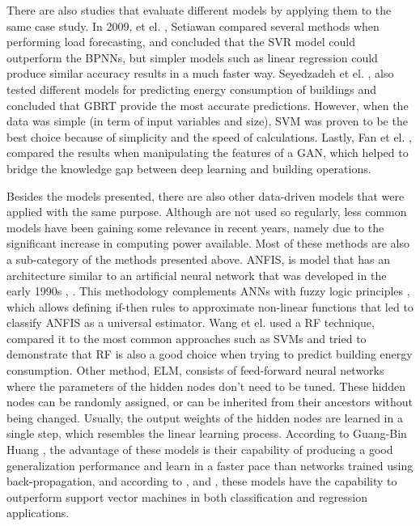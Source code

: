 There are also studies that evaluate different models by applying them to the same case study. In 2009, et el. \cite{svmr0}, Setiawan compared several methods when performing load forecasting, and concluded that the \ac{SVR} model could outperform the \ac{BPNN}s, but simpler models such as linear regression could produce similar accuracy results in a much faster way. Seyedzadeh et el. \cite{other2}, also tested different models for predicting energy consumption of buildings and concluded that \ac{GBRT} provide the most accurate predictions. However, when the data was simple (in term of input variables and size), \ac{SVM} was proven to be the best choice because of simplicity and the speed of calculations. Lastly, Fan et el. \cite{other1}, compared the results when manipulating the features of a \ac{GAN}, which helped to bridge the knowledge gap between deep learning and building operations. 

Besides the models presented, there are also other data-driven models that were applied with the same purpose. Although are not used so regularly, less common models have been gaining some relevance in recent years, namely due to the significant increase in computing power available. Most of these methods are also a sub-category of the methods presented above. \ac{ANFIS}, is model that has an architecture similar to an artificial neural network that was developed in the early 1990s \cite{anfis1}, \cite{anfis2}. This methodology complements \ac{ANN}s with fuzzy logic principles \cite{anfis3}, which allows defining if-then rules to approximate non-linear functions that led \cite{anfis4} to classify \ac{ANFIS} as a universal estimator. Wang et el. \cite{rf0} used a \ac{RF} technique, compared it to the most common approaches such as \ac{SVM}s and tried to demonstrate that RF is also a good choice when trying to predict building energy consumption. Other method, \ac{ELM}, consists of feed-forward neural networks where the parameters of the hidden nodes don't need to be tuned. These hidden nodes can be randomly assigned, or can be inherited from their ancestors without being changed. Usually, the output weights of the hidden nodes are learned in a single step, which resembles the linear learning process. According to Guang-Bin Huang \cite{elm1}, the advantage of these models is their capability of producing a good generalization performance and learn in a faster pace than networks trained using back-propagation, and according to \cite{elm2}, \cite{elm3} and \cite{elm4}, these models have the capability to outperform support vector machines in both classification and regression applications.

